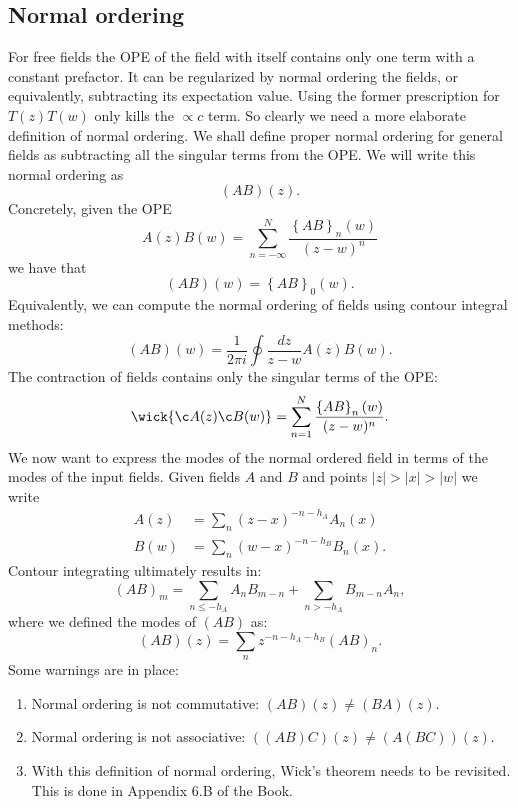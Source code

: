 \documentclass[submission, PhysLectNotes]{SciPost}
\begin{document}
\subsection{Normal ordering}
For free fields the OPE of the field with itself contains only one term with a constant prefactor. It can be regularized by normal ordering the fields, or equivalently, subtracting its expectation value.
Using the former prescription for $T(z)T(w)$ only kills the $\propto c$ term. So clearly we need a more elaborate definition of normal ordering. We shall define proper normal ordering for general fields as subtracting all the singular terms from the OPE. We will write this normal ordering as
\begin{equation}
	(AB)(z).
\end{equation}
Concretely, given the OPE
\begin{equation}
	A(z)B(w) = \sum_{n=-\infty}^{N}\frac{\left\{AB\right\}_n(w)}{(z-w)^n}
\end{equation}
we have that
\begin{equation}
	(AB)(w) = \left\{AB\right\}_0(w).
\end{equation}
Equivalently, we can compute the normal ordering of fields using contour integral methods:
\begin{equation}
	(AB)(w) = \frac{1}{2\pi i}\oint \frac{dz}{z-w}A(z)B(w).
\end{equation}
The contraction of fields contains only the singular terms of the OPE:
\begin{equation}
	\wick{\c A(z) \c B(w)} = \sum_{n=1}^N\frac{\left\{AB\right\}_n(w)}{(z-w)^n}.
\end{equation}
We now want to express the modes of the normal ordered field in terms of the modes of the input fields. Given fields $A$ and $B$ and points $|z|>|x|>|w|$ we write
\begin{subequations}
\begin{align}
	A(z) &= \sum_n (z-x)^{-n-h_A}A_n(x) \\
	B(w) &= \sum_n (w-x)^{-n-h_B}B_n(x).
\end{align}
\end{subequations}
Contour integrating ultimately results in:
\begin{equation}
	(AB)_m = \sum_{n\leq -h_A} A_nB_{m-n} + \sum_{n>-h_A}B_{m-n}A_n,
\end{equation}
where we defined the modes of $(AB)$ as:
\begin{equation}
	(AB)(z) = \sum_n z^{-n-h_A-h_B}(AB)_n.
\end{equation}
Some warnings are in place:
\begin{enumerate}
	\item Normal ordering is not commutative: $(AB)(z) \neq (BA)(z)$.
	\item Normal ordering is not associative: $((AB)C)(z)\neq(A(BC))(z)$.
	\item With this definition of normal ordering, Wick's theorem needs to be revisited. This is done in Appendix 6.B of the Book.
\end{enumerate}
\end{document}
